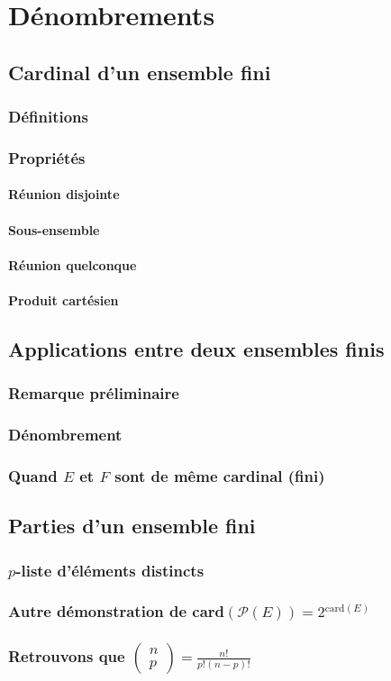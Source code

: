 \documentclass[12pt,a4paper,french]{book}
\begin{document}
\chapter{Dénombrements}
	\section{Cardinal d'un ensemble fini}
		\subsection{Définitions}
		\subsection{Propriétés}
			\subsubsection{Réunion disjointe}
			\subsubsection{Sous-ensemble}
			\subsubsection{Réunion quelconque}
			\subsubsection{Produit cartésien}
	\section{Applications entre deux ensembles finis}
		\subsection{Remarque préliminaire}
		\subsection{Dénombrement}
		\subsection{Quand $E$ et $F$ sont de même cardinal (fini)}
	\section{Parties d'un ensemble fini}
		\subsection{$p$-liste d'éléments distincts}
		\subsection{Autre démonstration de card$(\mathcal{P}(E)) = 2^{\mbox{card}(E)}$}
		\subsection{Retrouvons que $\begin{pmatrix}
				n \\ p
			\end{pmatrix} = \frac{n!}{p!(n-p)!}$}
	
	
	
\end{document}
